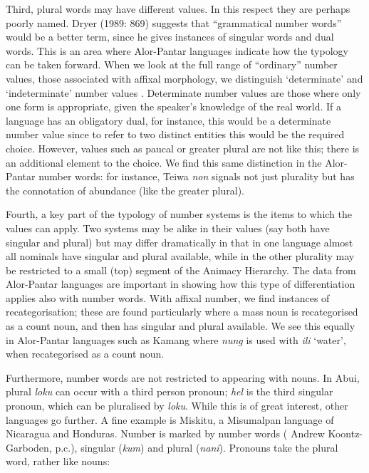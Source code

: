  Third, plural words may have different values. In this respect they are perhaps poorly named. Dryer (1989: 869) suggests that ``grammatical number words'' would be a better term, since he gives instances of singular words and dual words. This is an area where Alor-Pantar languages indicate how the typology can be taken forward. When we look at the full range of ``ordinary'' number values, those associated with affixal morphology, we distinguish `determinate' and `indeterminate' number values \citep[39-41]{Corbett2000}. Determinate number values are those where only one form is appropriate, given the speaker's knowledge of the real world. If a language has an obligatory dual, for instance, this would be a determinate number value since to refer to two distinct entities this would be the required choice. However, values such as paucal or greater plural are not like this; there is an additional element to the choice. We find this same distinction in the Alor-Pantar number words: for instance, Teiwa \textit{non
}signals not just plurality but has the connotation of abundance (like the greater plural).

 Fourth, a key part of the typology of number systems is the items to which the values can apply. Two systems may be alike in their values (say both have singular and plural) but may differ dramatically in that in one language almost all nominals have singular and plural available, while in the other plurality may be restricted to a small (top) segment of the Animacy Hierarchy. The data from Alor-Pantar languages are important in showing how this type of differentiation applies also with number words. With affixal number, we find instances of recategorisation; these are found particularly where a mass noun is recategorised as a count noun, and then has singular and plural available. We see this equally in Alor-Pantar languages such as Kamang where \textit{nung} is used with \textit{ili} `water', when recategorised as a count noun.

 Furthermore, number words are not restricted to appearing with nouns. In Abui, plural \textit{loku} can occur with a third person pronoun; \textit{hel} is the third singular pronoun, which can be pluralised by \textit{loku}. While this is of great interest, other languages go further. A fine example is Miskitu, a Misumalpan language of Nicaragua and Honduras. Number is marked by number words (\citealt{Greenms} Andrew Koontz-Garboden, p.c.), singular (\textit{kum}) and plural (\textit{nani}). Pronouns take the plural word, rather like nouns:


